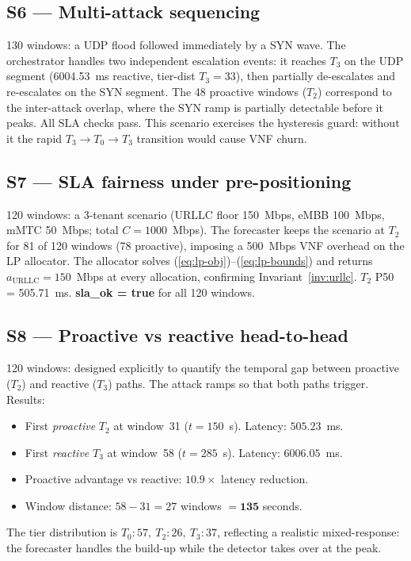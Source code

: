 \subsection{S6 — Multi-attack sequencing}
\label{sec:s6}
130 windows: a UDP flood followed immediately by a SYN wave. The
orchestrator handles two independent escalation events: it reaches $T_3$
on the UDP segment (6004.53~ms reactive, tier-dist $T_3{=}33$), then
partially de-escalates and re-escalates on the SYN segment. The 48
proactive windows ($T_2$) correspond to the inter-attack overlap, where
the SYN ramp is partially detectable before it peaks. All SLA checks
pass. This scenario exercises the hysteresis guard: without it the
rapid $T_3 \to T_0 \to T_3$ transition would cause VNF churn.

\subsection{S7 — SLA fairness under pre-positioning}
\label{sec:s7}
120 windows: a 3-tenant scenario (URLLC floor 150~Mbps, eMBB 100~Mbps,
mMTC 50~Mbps; total $C{=}1000$~Mbps). The forecaster keeps the scenario
at $T_2$ for 81 of 120 windows (78 proactive), imposing a 500~Mbps VNF
overhead on the LP allocator. The allocator solves
(\ref{eq:lp-obj})--(\ref{eq:lp-bounds}) and returns $a_{\text{URLLC}}
= 150$~Mbps at every allocation, confirming Invariant~\ref{inv:urllc}.
$T_2$ P50 = 505.71~ms. \textbf{sla\_ok = true} for all 120 windows.

\subsection{S8 — Proactive vs reactive head-to-head}
\label{sec:s8}
120 windows: designed explicitly to quantify the temporal gap between
proactive ($T_2$) and reactive ($T_3$) paths. The attack ramps so that
both paths trigger. Results:
\begin{itemize}
  \item First \emph{proactive} $T_2$ at window~31 ($t = 150$~s).
        Latency: $505.23$~ms.
  \item First \emph{reactive} $T_3$ at window~58 ($t = 285$~s).
        Latency: $6006.05$~ms.
  \item Proactive advantage vs reactive: $10.9\times$ latency reduction.
  \item Window distance: $58 - 31 = 27$ windows $= \mathbf{135}$ seconds.
\end{itemize}
The tier distribution is $T_0{:}57,\ T_2{:}26,\ T_3{:}37$, reflecting
a realistic mixed-response: the forecaster handles the build-up while
the detector takes over at the peak.

